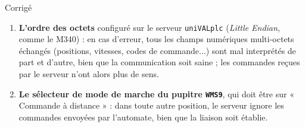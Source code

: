 \begin{UPSTIactivite}

\begin{UPSTIcorrectionP}{Corrigé}
\begin{enumerate}
    \item \textbf{L'ordre des octets} configuré sur le serveur
    \texttt{uniVALplc} (\emph{Little Endian}, comme le M340) : en cas
    d'erreur, tous les champs numériques multi-octets échangés (positions,
    vitesses, codes de commande...) sont mal interprétés de part et
    d'autre, bien que la communication soit saine ; les commandes reçues
    par le serveur n'ont alors plus de sens.
    \item \textbf{Le sélecteur de mode de marche du pupitre \texttt{WMS9}},
    qui doit être sur « Commande à distance » : dans toute autre position,
    le serveur ignore les commandes envoyées par l'automate, bien que la
    liaison soit établie.
\end{enumerate}
\end{UPSTIcorrectionP}
\end{UPSTIactivite}
